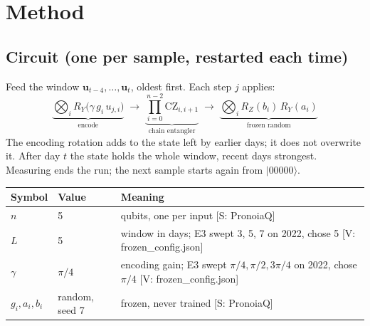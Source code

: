 \documentclass[11pt,a4paper]{article}
\newcommand{\tagbox}[2]{{\footnotesize\color{#1}\textsf{[#2]}}}
\newcommand{\supp}[1]{\tagbox{ForestGreen!70!black}{S: #1}}  %
\newcommand{\veri}[1]{\tagbox{ForestGreen!70!black}{V: #1}}  %
\begin{document}
\section{Method}

\subsection{Circuit (one per sample, restarted each time)}
Feed the window $\mathbf u_{t-4},\dots,\mathbf u_t$, oldest first. Each step $j$ applies:
\[
\underbrace{\bigotimes_i R_Y\!\big(\gamma\, g_i\, u_{j,i}\big)}_{\text{encode}}
\;\longrightarrow\;
\underbrace{\prod_{i=0}^{n-2} \mathrm{CZ}_{i,i+1}}_{\text{chain entangler}}
\;\longrightarrow\;
\underbrace{\bigotimes_i R_Z(b_i)\,R_Y(a_i)}_{\text{frozen random}}
\]
The encoding rotation adds to the state left by earlier days; it does not overwrite it. After day $t$ the state holds
the whole window, recent days strongest. Measuring ends the run; the next sample starts again from $|00000\rangle$.

\begin{center}\small
\begin{tabularx}{\linewidth}{@{}l l Y@{}}
\toprule
\textbf{Symbol} & \textbf{Value} & \textbf{Meaning}\\
\midrule
$n$ & 5 & qubits, one per input \supp{PronoiaQ}\\
$L$ & 5 & window in days; E3 swept 3, 5, 7 on 2022, chose 5 \veri{frozen\_config.json}\\
$\gamma$ & $\pi/4$ & encoding gain; E3 swept $\pi/4,\pi/2,3\pi/4$ on 2022, chose $\pi/4$ \veri{frozen\_config.json}\\
$g_i,a_i,b_i$ & random, seed 7 & frozen, never trained \supp{PronoiaQ}\\
\bottomrule
\end{tabularx}
\end{center}
\end{document}
